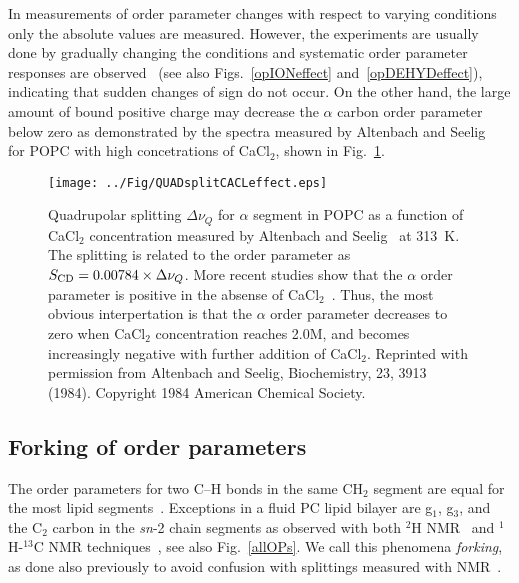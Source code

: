 \documentclass[aps,prl,superscriptaddress,twocolumn]{revtex4}
\begin{document}
In measurements of order parameter changes with respect to varying 
conditions~\cite{seelig74,seelig77,bechinger91,ulrich94,mallikarjunaiah11,dvinskikh05a,akutsu81,altenbach84,seelig87,scherer89,brown78,douliez95,ferreira13,leftin14,kuchinka89,roux90,leftin13} 
only the absolute values are measured. However, the experiments are usually done by gradually changing the conditions and systematic 
order parameter responses are observed~\cite{akutsu81,altenbach84,bechinger91,ulrich94,dvinskikh05b,mallikarjunaiah11,ferreira13} 
(see also Figs.~\ref{opIONeffect} and~\ref{opDEHYDeffect}), indicating that sudden changes of sign do not occur. 
On the other hand, the large amount of bound positive charge may decrease the $\alpha$ carbon order parameter below zero as demonstrated by the spectra measured by Altenbach and Seelig~\cite{altenbach84} for POPC with high concetrations of CaCl$_2$,
shown in Fig.~\ref{qsCACLeffect}.
\begin{figure}[]
  \texttt{[image: ../Fig/QUADsplitCACLeffect.eps]}
\newline
  \caption{\label{qsCACLeffect}
    Quadrupolar splitting $\Delta \nu_Q$ for $\alpha$ segment in POPC as a function of CaCl$_2$ concentration measured by Altenbach and Seelig~\cite{altenbach84} at 313~K.
    The splitting is related to the order parameter as $S_{{\rm CD}}=0.00784 \times \Delta \nu_Q$. 
    More recent studies show that the $\alpha$ order parameter is positive in the absense of CaCl$_2$~\cite{hong95a,hong95b,gross97}.
    Thus, the most obvious interpertation is that the $\alpha$ order parameter decreases to zero when CaCl$_2$ concentration reaches 2.0M, and 
    becomes increasingly negative with further addition of CaCl$_2$. Reprinted with permission from Altenbach and Seelig, Biochemistry, 23, 3913 (1984). Copyright 1984 American Chemical Society.    
  } 
\end{figure}



\subsection{Forking of order parameters}

The order parameters for two C--H bonds in the same CH$_2$ segment are equal for the most lipid 
segments~\cite{seelig74,seelig77,seelig78,gally81,gross97,dvinskikh05a,ferreira13}.
Exceptions in a fluid PC lipid bilayer are g$_1$, g$_3$, and  the C$_2$ carbon in the \textit{sn}-2 chain 
segments as observed with both $^2$H NMR~\cite{seelig75,seelig78,engel81,gally81} and 
$^1$H-$^{13}$C NMR techniques~\cite{gross97,dvinskikh05a,ferreira13}, see also Fig.~\ref{allOPs}.
We call this phenomena {\it forking}, as done also previously to avoid confusion with splittings measured with NMR~\cite{botan15}.
\end{document}
